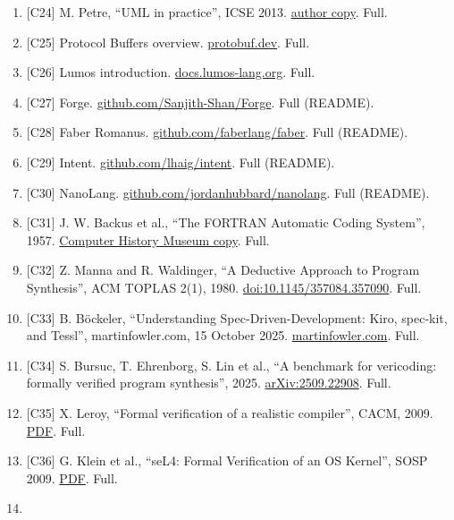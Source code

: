 \documentclass[10pt,letterpaper]{article}
\begin{document}
\begin{enumerate}
  Full.
\item
  {[}C24{]} M. Petre, ``UML in practice'', ICSE 2013.
  \href{https://oro.open.ac.uk/35805/}{author copy}. Full.
\item
  {[}C25{]} Protocol Buffers overview.
  \href{https://protobuf.dev/overview/}{protobuf.dev}. Full.
\item
  {[}C26{]} Lumos introduction.
  \href{https://docs.lumos-lang.org/getting-started/introduction}{docs.lumos-lang.org}.
  Full.
\item
  {[}C27{]} Forge.
  \href{https://github.com/Sanjith-Shan/Forge}{github.com/Sanjith-Shan/Forge}.
  Full (README).
\item
  {[}C28{]} Faber Romanus.
  \href{https://github.com/faberlang/faber}{github.com/faberlang/faber}.
  Full (README).
\item
  {[}C29{]} Intent.
  \href{https://github.com/lhaig/intent}{github.com/lhaig/intent}. Full
  (README).
\item
  {[}C30{]} NanoLang.
  \href{https://github.com/jordanhubbard/nanolang}{github.com/jordanhubbard/nanolang}.
  Full (README).
\item
  {[}C31{]} J. W. Backus et al., ``The FORTRAN Automatic Coding
  System'', 1957.
  \href{https://archive.computerhistory.org/resources/text/Fortran/102663113.05.01.acc.pdf}{Computer
  History Museum copy}. Full.
\item
  {[}C32{]} Z. Manna and R. Waldinger, ``A Deductive Approach to Program
  Synthesis'', ACM TOPLAS 2(1), 1980.
  \href{https://doi.org/10.1145/357084.357090}{doi:10.1145/357084.357090}.
  Full.
\item
  {[}C33{]} B. Böckeler, ``Understanding Spec-Driven-Development: Kiro,
  spec-kit, and Tessl'', martinfowler.com, 15 October 2025.
  \href{https://martinfowler.com/articles/exploring-gen-ai/sdd-3-tools.html}{martinfowler.com}.
  Full.
\item
  {[}C34{]} S. Bursuc, T. Ehrenborg, S. Lin et al., ``A benchmark for
  vericoding: formally verified program synthesis'', 2025.
  \href{https://arxiv.org/abs/2509.22908}{arXiv:2509.22908}. Full.
\item
  {[}C35{]} X. Leroy, ``Formal verification of a realistic compiler'',
  CACM, 2009.
  \href{https://xavierleroy.org/publi/compcert-CACM.pdf}{PDF}. Full.
\item
  {[}C36{]} G. Klein et al., ``seL4: Formal Verification of an OS
  Kernel'', SOSP 2009.
  \href{https://www.sigops.org/s/conferences/sosp/2009/papers/klein-sosp09.pdf}{PDF}.
  Full.
\item

\end{enumerate}
\end{document}
